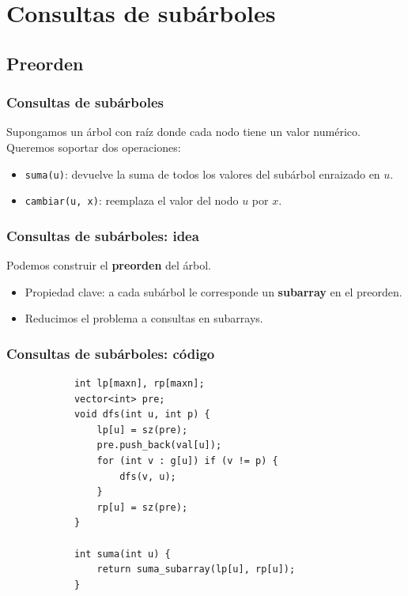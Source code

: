 \section{Consultas de subárboles}

\subsection{Preorden}

\begin{frame}
  \frametitle{Consultas de subárboles}

  Supongamos un árbol con raíz donde cada nodo tiene un valor numérico. Queremos soportar dos operaciones:

  \begin{itemize}
    \item \texttt{suma(u)}: devuelve la suma de todos los valores del subárbol enraizado en \(u\).
    \item \texttt{cambiar(u, x)}: reemplaza el valor del nodo \(u\) por \(x\).
  \end{itemize}
\end{frame}




\begin{frame}
  \frametitle{Consultas de subárboles: idea}

  Podemos construir el \textbf{preorden} del árbol.

  \vspace{0.75em}

  \begin{itemize}
    \item Propiedad clave: a cada subárbol le corresponde un \textbf{subarray} en el preorden.
    \item Reducimos el problema a consultas en subarrays.
  \end{itemize}
\end{frame}


\begin{frame}[fragile]
  \frametitle{Consultas de subárboles: código}

\begin{lstlisting}
            int lp[maxn], rp[maxn];
            vector<int> pre;
            void dfs(int u, int p) {
                lp[u] = sz(pre);
                pre.push_back(val[u]);
                for (int v : g[u]) if (v != p) {
                    dfs(v, u);
                }
                rp[u] = sz(pre);
            }
            
            int suma(int u) {
                return suma_subarray(lp[u], rp[u]);
            }
\end{lstlisting}
\end{frame}

